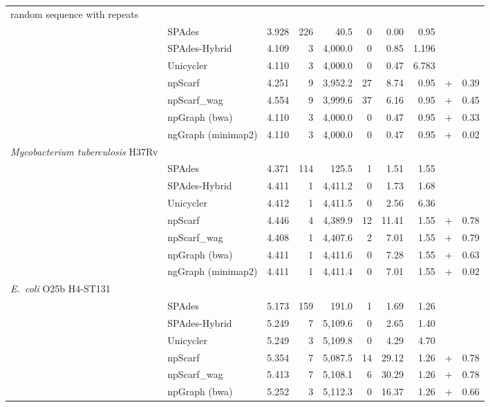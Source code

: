 \documentclass[10pt,twocolumn,twoside]{genpaper}
\newcommand{\ec}{\emph{E.~coli}}
\begin{document}
\begin{longtable}{llcrrrrr@{\hspace{2pt}}c@{\hspace{2pt}}r}
\rowcolor{Gray} \multicolumn{10}{l}
{ random sequence with repeats} \\*  
 & SPAdes  & 3.928 & 226  & 40.5  &  0 &  0.00 &  0.95 &  &  \\*
 & SPAdes-Hybrid  & 4.109 & 3  & 4,000.0  & 0  & 0.85  & 1.196  &  &  \\*
 & Unicycler  & 4.110 & 3  & 4,000.0  &  0 &  0.47 & 6.783  &  &  \\*
 & npScarf  & 4.251 &  9 & 3,952.2  &  27 &  8.74 &  0.95 & + & 0.39 \\*
 & npScarf\_wag & 4.554 & 9  &  3,999.6 &  37 &  6.16 &  0.95 & + &  0.45\\*
 & npGraph (bwa)  & 4.110 & 3  & 4,000.0  & 0  &  0.47 &  0.95 & + &  0.33\\*
 & ngGraph (minimap2)  & 4.110 & 3  & 4,000.0  & 0  & 0.47  &  0.95 & + &  0.02\\
\rowcolor{Gray} \multicolumn{10}{l}
{\emph{Mycobacterium tuberculosis} H37Rv} \\*  
 & SPAdes  & 4.371 & 114  &  125.5 &  1 & 1.51  &  1.55 &  &  \\*
 & SPAdes-Hybrid  & 4.411 & 1  & 4,411.2  & 0  & 1.73  & 1.68  &  &  \\*
 & Unicycler  & 4.412 &  1 &  4,411.5 & 0  &  2.56 &  6.36 &  &  \\*
 & npScarf  & 4.446 & 4  & 4,389.9  & 12  &  11.41 & 1.55  & + & 0.78 \\*
 & npScarf\_wag  & 4.408 & 1  & 4,407.6  &  2 &  7.01 & 1.55  & + & 0.79 \\*
 & npGraph (bwa)  & 4.411 &  1 & 4,411.6  &  0 & 7.28  &  1.55 & + & 0.63 \\*
 & ngGraph (minimap2)  & 4.411 & 1 & 4,411.4  &  0 &  7.01 & 1.55  & + &  0.02\\
\rowcolor{Gray} \multicolumn{10}{l}
{\ec{} O25b H4-ST131} \\*  
 & SPAdes  & 5.173 &  159 & 191.0  &  1 &  1.69 & 1.26  &  &  \\*
 & SPAdes-Hybrid  & 5.249 &  7 &  5,109.6 & 0  & 2.65  & 1.40  &  &  \\*
 & Unicycler  & 5.249 &  3 & 5,109.8  &  0 &  4.29 &  4.70 &  &  \\*
 & npScarf  & 5.354 & 7  & 5,087.5  &  14 & 29.12  &  1.26 & + &  0.78\\*
 & npScarf\_wag  & 5.413 &  7 & 5,108.1  & 6  &  30.29 & 1.26  & + & 0.78 \\*
 & npGraph (bwa)  & 5.252 & 3  &  5,112.3 &  0 & 16.37  & 1.26  & + &  0.66\\*

\end{longtable}
\end{document}
